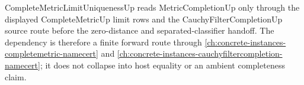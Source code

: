 CompleteMetricLimitUniquenessUp reads MetricCompletionUp only through the displayed CompleteMetricUp limit rows and the CauchyFilterCompletionUp source route before the zero-distance and separated-classifier handoff. The dependency is therefore a finite forward route through \autoref{ch:concrete-instances-completemetric-namecert} and \autoref{ch:concrete-instances-cauchyfiltercompletion-namecert}; it does not collapse into host equality or an ambient completeness claim.
